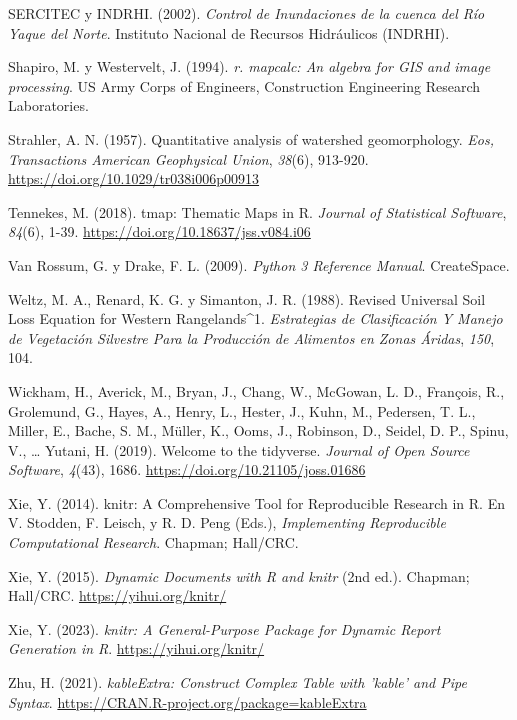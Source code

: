 \documentclass[spanish]{article}
\newlength{\cslhangindent}
\newlength{\cslentryspacingunit} %
\newenvironment{CSLReferences}[2] %
 {%
  \setlength{\parindent}{0pt}
  \ifodd #1
  \let\oldpar\par
  \def\par{\hangindent=\cslhangindent\oldpar}
  \fi
  \setlength{\parskip}{#2\cslentryspacingunit}
 }%
 {}
\begin{document}
\begin{CSLReferences}{1}{0}
\leavevmode{}%
SERCITEC y INDRHI. (2002). \emph{{Control de Inundaciones de la cuenca
del Río Yaque del Norte}}. {Instituto Nacional de Recursos Hidráulicos
(INDRHI)}.

\leavevmode{}%
Shapiro, M. y Westervelt, J. (1994). \emph{r. mapcalc: An algebra for
GIS and image processing}. US Army Corps of Engineers, Construction
Engineering Research Laboratories.

\leavevmode{}%
Strahler, A. N. (1957). Quantitative analysis of watershed
geomorphology. \emph{Eos, Transactions American Geophysical Union},
\emph{38}(6), 913-920. \url{https://doi.org/10.1029/tr038i006p00913}

\leavevmode{}%
Tennekes, M. (2018). {tmap}: Thematic Maps in {R}. \emph{Journal of
Statistical Software}, \emph{84}(6), 1-39.
\url{https://doi.org/10.18637/jss.v084.i06}

\leavevmode{}%
Van Rossum, G. y Drake, F. L. (2009). \emph{Python 3 Reference Manual}.
CreateSpace.

\leavevmode{}%
Weltz, M. A., Renard, K. G. y Simanton, J. R. (1988). Revised Universal
Soil Loss Equation for Western Rangelands{\^{}}1. \emph{Estrategias de
Clasificación Y Manejo de Vegetación Silvestre Para la Producción de
Alimentos en Zonas Áridas}, \emph{150}, 104.

\leavevmode{}%
Wickham, H., Averick, M., Bryan, J., Chang, W., McGowan, L. D.,
François, R., Grolemund, G., Hayes, A., Henry, L., Hester, J., Kuhn, M.,
Pedersen, T. L., Miller, E., Bache, S. M., Müller, K., Ooms, J.,
Robinson, D., Seidel, D. P., Spinu, V., \ldots{} Yutani, H. (2019).
Welcome to the {tidyverse}. \emph{Journal of Open Source Software},
\emph{4}(43), 1686. \url{https://doi.org/10.21105/joss.01686}

\leavevmode{}%
Xie, Y. (2014). knitr: A Comprehensive Tool for Reproducible Research in
{R}. En V. Stodden, F. Leisch, y R. D. Peng (Eds.), \emph{Implementing
Reproducible Computational Research}. Chapman; Hall/CRC.

\leavevmode{}%
Xie, Y. (2015). \emph{Dynamic Documents with {R} and knitr} (2nd ed.).
Chapman; Hall/CRC. \url{https://yihui.org/knitr/}

\leavevmode{}%
Xie, Y. (2023). \emph{knitr: A General-Purpose Package for Dynamic
Report Generation in R}. \url{https://yihui.org/knitr/}

\leavevmode{}%
Zhu, H. (2021). \emph{kableExtra: Construct Complex Table with 'kable'
and Pipe Syntax}. \url{https://CRAN.R-project.org/package=kableExtra}

\end{CSLReferences}



\end{document}
